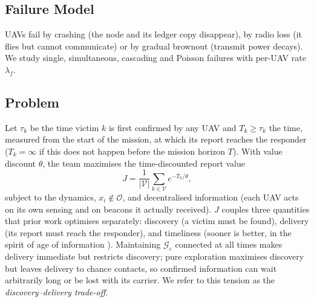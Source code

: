 \subsection{Failure Model}
UAVs fail by crashing (the node and its ledger copy disappear), by radio loss (it flies but
cannot communicate) or by gradual brownout (transmit power decays). We study single,
simultaneous, cascading and Poisson failures with per-UAV rate $\lambda_f$.

\subsection{Problem}
Let $\tau_k$ be the time victim $k$ is first confirmed by any UAV and $T_k\ge\tau_k$ the time,
measured from the start of the mission, at which its report reaches the responder ($T_k=\infty$ if
this does not happen before the mission horizon $T$). With value discount $\theta$, the team maximises the time-discounted report value
\begin{equation}
J=\frac{1}{|\mathcal{V}|}\sum_{k\in\mathcal{V}} e^{-T_k/\theta},\label{eq:J}
\end{equation}
subject to the dynamics, $x_i\notin\mathcal{O}$, and decentralised information (each UAV acts on
its own sensing and on beacons it actually received). $J$ couples three quantities that prior
work optimises separately: discovery (a victim must be found), delivery (its report must reach
the responder), and timeliness (sooner is better, in the spirit of age of information
\cite{kaul2012aoi}). Maintaining $\mathcal{G}_\varepsilon$ connected at all times makes delivery
immediate but restricts discovery; pure exploration maximises discovery but leaves delivery to
chance contacts, so confirmed information can wait arbitrarily long or be lost with its carrier.
We refer to this tension as the \emph{discovery--delivery trade-off}.
